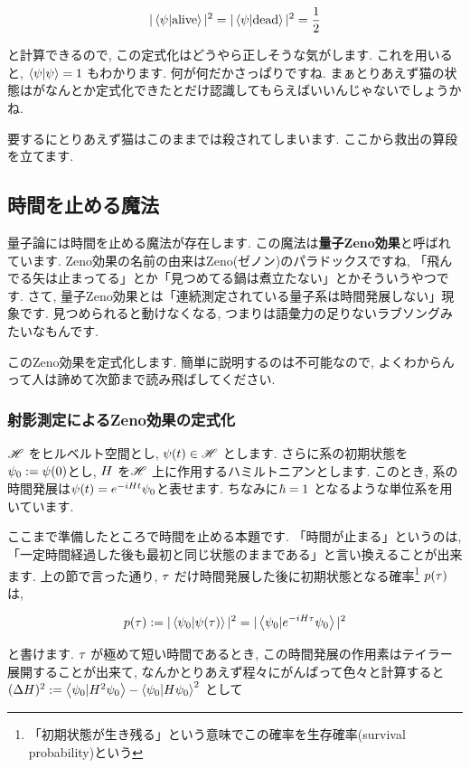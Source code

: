 \documentclass[10pt,b5jsbook,dvips,dvipdfmx,openany]{jsbook}
\theoremstyle{definition}
\begin{document}
    \[
    | \mathinner{\left\langle{\psi | \mathrm{alive} }\right\rangle} | ^2 = | \mathinner{\left\langle{\psi | \mathrm{dead} }\right\rangle} |^2= \frac{1}{2}
    \]

    と計算できるので, この定式化はどうやら正しそうな気がします. これを用いると, $ \mathinner{\left\langle{\psi | \psi}\right\rangle} = 1 $ もわかります. 何が何だかさっぱりですね. まぁとりあえず猫の状態はがなんとか定式化できたとだけ認識してもらえばいいんじゃないでしょうかね.

    要するにとりあえず猫はこのままでは殺されてしまいます. ここから救出の算段を立てます.

    \subsection{時間を止める魔法}
    量子論には時間を止める魔法が存在します. この魔法は\textbf{量子Zeno効果}と呼ばれています. Zeno効果の名前の由来はZeno(ゼノン)のパラドックスですね, 「飛んでる矢は止まってる」とか「見つめてる鍋は煮立たない」とかそういうやつです. さて, 量子Zeno効果とは「連続測定されている量子系は時間発展しない」現象です. 見つめられると動けなくなる, つまりは語彙力の足りないラブソングみたいなもんです.

    このZeno効果を定式化します. 簡単に説明するのは不可能なので, よくわからんって人は諦めて次節まで読み飛ばしてください.

    \subsubsection{射影測定によるZeno効果の定式化}
    $ \mathinner{\mathscr{H}} $ をヒルベルト空間とし, $ \mathinner{\psi (t) \in \mathscr{H}} $ とします. さらに系の初期状態を$ \mathinner{\psi_{0} := \psi (0)}  $とし, $\mathinner{H}$ を$ \mathinner{\mathscr{H}} $ 上に作用するハミルトニアンとします. このとき,  系の時間発展は$ \mathinner{\psi (t) = e^{-iHt}  \psi_{0}}  $と表せます. ちなみに$ \mathinner{\hbar = 1} $ となるような単位系を用いています.

    ここまで準備したところで時間を止める本題です. 「時間が止まる」というのは, 「一定時間経過した後も最初と同じ状態のままである」と言い換えることが出来ます. 上の節で言った通り, $ \mathinner{\tau} $ だけ時間発展した後に初期状態となる確率\footnote{「初期状態が生き残る」という意味でこの確率を生存確率(survival probability)という} $ \mathinner{p(\tau)} $ は,

    \[
    p(\tau) := | \mathinner{\left\langle{\psi_{0} | \psi (\tau )}\right\rangle} | ^2 = | \mathinner{\left\langle{\psi_{0} |  e^{-iH\tau}  \psi_{0}}\right\rangle}| ^2
    \]

    と書けます. $ \mathinner{\tau} $ が極めて短い時間であるとき, この時間発展の作用素はテイラー展開することが出来て, なんかとりあえず程々にがんばって色々と計算すると
    $  (\Delta H ) ^2 := \mathinner{\left\langle{\psi_{0} |H^2 \psi_{0}}\right\rangle} - \mathinner{\left\langle{\psi_{0} |H \psi_{0}}\right\rangle}^2$ として
\end{document}
